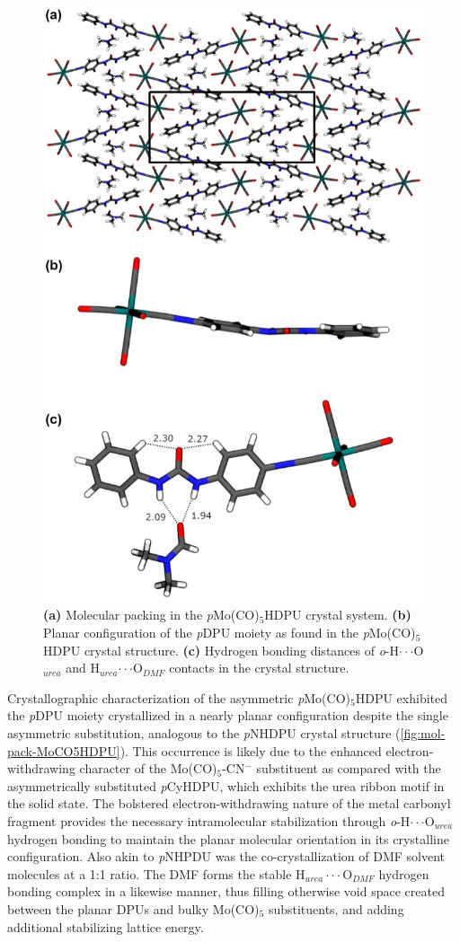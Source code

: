 \begin{figure}[h!]
    \centering
    \includegraphics[width=0.8\linewidth]{figures/pub3/Picture8.jpg}
    \caption{\textbf{(a)} Molecular packing in the \textit{p}Mo(CO)$_{5}$HDPU crystal system. \textbf{(b)} Planar configuration of the \textit{p}DPU moiety as found in the \textit{p}Mo(CO)$_{5}$HDPU crystal structure. \textbf{(c)} Hydrogen bonding distances of \textit{o}-H$\cdot \cdot \cdot$O$_{urea}$ and H$_{urea}$$\cdot \cdot \cdot$O$_{DMF}$ contacts in the crystal structure.}\label{fig:mol-pack-MoCO5HDPU}
\end{figure}


Crystallographic characterization of the asymmetric \textit{p}Mo(CO)$_{5}$HDPU exhibited the \textit{p}DPU moiety crystallized in a nearly planar configuration despite the single asymmetric substitution, analogous to the \textit{p}NHDPU crystal structure (\autoref{fig:mol-pack-MoCO5HDPU}). This occurrence is likely due to the enhanced electron-withdrawing character of the Mo(CO)$_{5}$-CN$^{-}$ substituent as compared with the asymmetrically substituted \textit{p}CyHDPU, which exhibits the urea ribbon motif in the solid state. The bolstered electron-withdrawing nature of the metal carbonyl fragment provides the necessary intramolecular stabilization through \textit{o}-H$\cdot \cdot \cdot$O$_{urea}$ hydrogen bonding to maintain the planar molecular orientation in its crystalline configuration. Also akin to \textit{p}NHPDU was the co-crystallization of DMF solvent molecules at a 1:1 ratio. The DMF forms the stable H$_{urea}\cdot \cdot \cdot$O$_{DMF}$ hydrogen bonding complex in a likewise manner, thus filling otherwise void space created between the planar DPUs and bulky Mo(CO)$_{5}$ substituents, and adding additional stabilizing lattice energy. 

